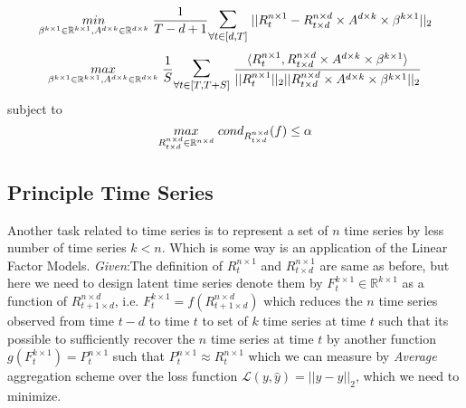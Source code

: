 \begin{equation} \label{lfm_loss}
\underset{\beta^{k \times 1}\in \mathbb{R}^{k\times 1}, A^{d\times k} \in \mathbb{R}^{d\times k}}{min}\hspace{1mm} \frac{1}{T-d+1} \mathlarger{\mathlarger{\sum}}_{\forall t\in [d,T]} \hspace{1mm} ||R^{n\times 1}_t-R^{n\times d}_{t\times d}\times A^{d\times k} \times \beta^{k \times 1}||_2
\end{equation}
\begin{equation} \label{lfm_reward}
\underset{\beta^{k \times 1}\in \mathbb{R}^{k\times 1}, A^{d\times k} \in \mathbb{R}^{d\times k}}{max}\hspace{1mm} \frac{1}{S} \mathlarger{\mathlarger{\sum}}_{\forall t\in [T,T+S]} \hspace{1mm} \frac{\langle R^{n\times 1}_t,R^{n\times d}_{t\times d}\times A^{d\times k} \times \beta^{k \times 1}\rangle}{||R^{n\times 1}_t||_2||R^{n\times d}_{t\times d}\times A^{d\times k} \times \beta^{k \times 1}||_2}
\end{equation}
subject to
\begin{equation} \label{lfm_cond}
\underset{R^{n\times d}_{t\times d} \in \mathbb{R}^{n\times d}}{max}\hspace{1mm} cond_{R^{n\times d}_{t\times d}}(f) \le \alpha
\end{equation}
\newline
\subsection{Principle Time Series}
Another task related to time series is to represent a set of $n$ time series by less number of time series $k<n$. Which is some way is an application of the Linear Factor Models.\newline
\textit{Given}:\newline The definition of $R^{n\times 1}_t$ and  $R^{n\times 1}_{t\times d}$ are same as before, but here we need to design latent time series denote them by $F^{k\times 1}_t \in \mathbb{R}^{k\times 1}$ as a function of $R^{n\times d}_{t+1\times d}$, i.e. $F^{k\times 1}_t = f(R^{n\times d}_{t+1\times d})$ which reduces the $n$ time series observed from time $t-d$ to time $t$ to set of $k$ time series at time $t$ such that its possible to sufficiently recover the $n$ time series at time $t$ by another function $ g(F^{k\times 1}_t) = P^{n \times 1}_{t}$ such that $P^{n \times 1}_{t} \approx R^{n \times 1}_{t}$ which we can measure by \textit{Average} aggregation scheme over the loss function $\mathcal{L}(y,\hat{y}) = ||y-\hat{y}||_2$, which we need to minimize.

